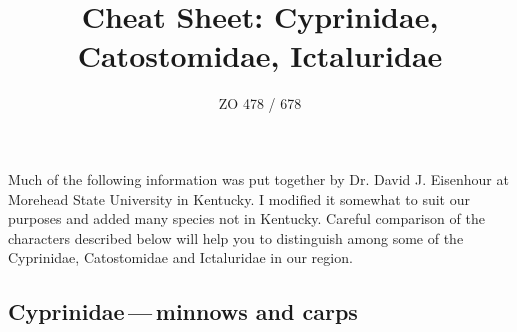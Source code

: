 \documentclass[11pt]{article}
\title{Cheat Sheet: Cyprinidae, Catostomidae, Ictaluridae}
\author{ZO 478 / 678}
\date{}                                           %
\begin{document}
\maketitle

Much of the following information was put together by Dr. David J. Eisenhour at Morehead State University in Kentucky.  I modified it somewhat to suit our purposes and added many species not in Kentucky. Careful comparison of the characters described below will help you to distinguish among some of the Cyprinidae, Catostomidae and Ictaluridae in our region.

\subsection*{Cyprinidae\,—\,minnows and  carps}

\noindent\begin{enumerate}


\end{enumerate}
\end{document}
